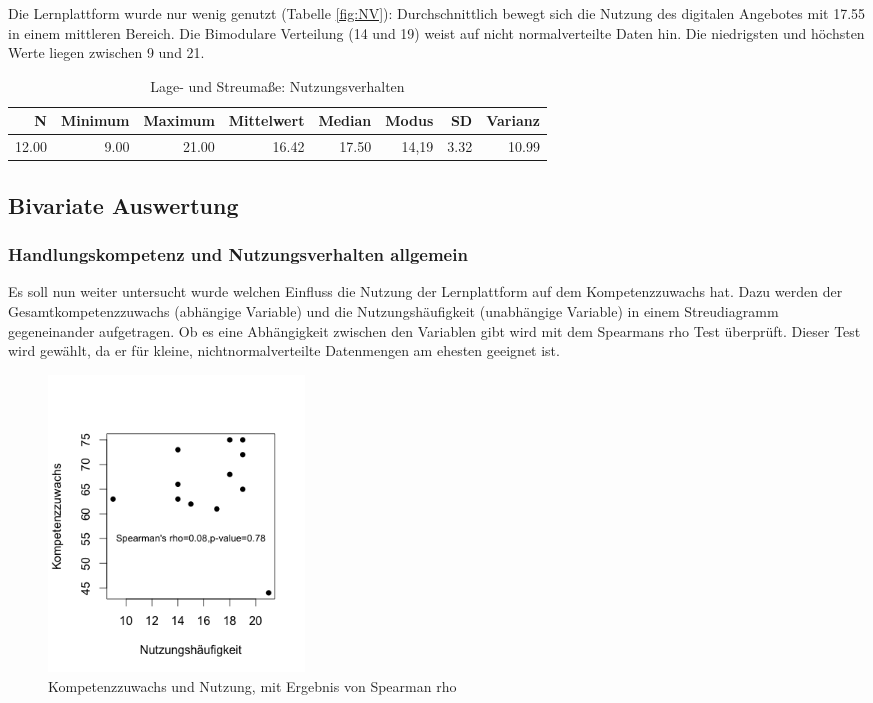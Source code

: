 \documentclass[12pt, bibliography=totoc]{scrartcl}
\begin{document}
Die Lernplattform wurde nur wenig genutzt (Tabelle \ref{fig:NV}):
Durchschnittlich bewegt sich die Nutzung des digitalen Angebotes mit
17.55 in einem mittleren Bereich. Die Bimodulare Verteilung (14 und 19)
weist auf nicht normalverteilte Daten hin. Die niedrigsten und höchsten
Werte liegen zwischen 9 und 21.

\begin{table}[H]
\centering
\caption{Lage- und Streumaße: Nutzungsverhalten}
\label{tab:NV}
\begin{tabular}{rrrrrrrr}
  \hline
  N & Minimum & Maximum & Mittelwert & Median & Modus & SD & Varianz \\
  \hline
 12.00 & 9.00 & 21.00 & 16.42 & 17.50 & 14,19 & 3.32 & 10.99 \\     
   \hline
\end{tabular}
\end{table}

\subsection{Bivariate Auswertung}\label{bivariate-auswertung}

\subsubsection{Handlungskompetenz und Nutzungsverhalten
allgemein}\label{handlungskompetenz-und-nutzungsverhalten-allgemein}

Es soll nun weiter untersucht wurde welchen Einfluss die Nutzung der
Lernplattform auf dem Kompetenzzuwachs hat. Dazu werden der
Gesamtkompetenzzuwachs (abhängige Variable) und die Nutzungshäufigkeit
(unabhängige Variable) in einem Streudiagramm gegeneinander aufgetragen.
Ob es eine Abhängigkeit zwischen den Variablen gibt wird mit dem
Spearmans rho Test überprüft. Dieser Test wird gewählt, da er für
kleine, nichtnormalverteilte Datenmengen am ehesten geeignet ist.

\begin{figure}[H]
\centering
\includegraphics[width=0.33\textwidth]{Anhang/Spearman.png}
\caption{Kompetenzzuwachs und Nutzung, mit Ergebnis von Spearman rho}
\label{fig:spear}
\end{figure}
\end{document}
